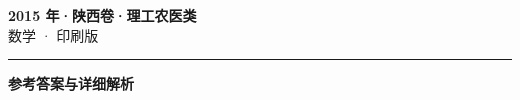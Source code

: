 \documentclass[zihao=5, a4paper]{ctexart}
\begin{document}
\begin{center}
  {\Large\bfseries 2015 年·陕西卷·理工农医类}\\[4pt]
  {\large 数学 · 印刷版}
\end{center}
\medskip
{}

\par\bigskip\hrule\bigskip
{}
\begin{center}{\large\bfseries 参考答案与详细解析}\end{center}
\smallskip

\end{document}
